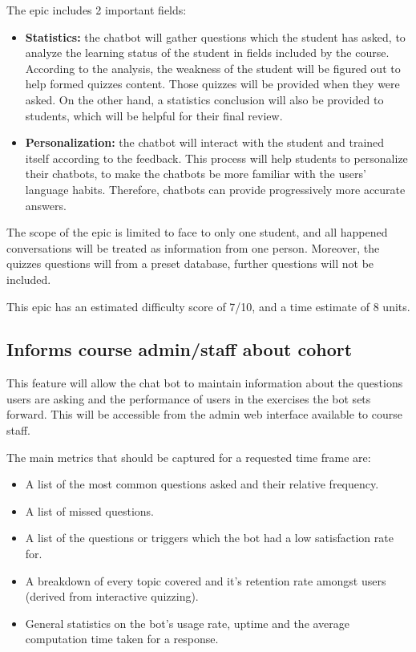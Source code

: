 \documentclass{article}
\begin{document}
The epic includes 2 important fields:
\begin{itemize}
  \item \textbf{Statistics:} the chatbot will gather questions which the student has asked, to analyze the learning status of the student in fields included by the course. According to the analysis, the weakness of the student will be figured out to help formed quizzes content. Those quizzes will be provided when they were asked. On the other hand, a statistics conclusion will also be provided to students, which will be helpful for their final review.
  \item \textbf{Personalization:} the chatbot will interact with the student and trained itself according to the feedback. This process will help students to personalize their chatbots, to make the chatbots be more familiar with the users’ language habits. Therefore, chatbots can provide progressively more accurate answers. 
\end{itemize}

The scope of the epic is limited to face to only one student, and all happened conversations will be treated as information from one person. Moreover, the quizzes questions will from a preset database, further questions will not be included.

This epic has an estimated difficulty score of 7/10, and a time estimate of 8 units.


\subsection{Informs course admin/staff about cohort}

This feature will allow the chat bot to maintain information about the questions users are asking and the performance of users in the exercises the bot sets forward. This will be accessible from the admin web interface available to course staff.

The main metrics that should be captured for a requested time frame are:
\begin{itemize}
  \item A list of the most common questions asked and their relative frequency.
  \item A list of missed questions.
  \item A list of the questions or triggers which the bot had a low satisfaction rate for.
  \item A breakdown of every topic covered and it's retention rate amongst users (derived from interactive quizzing).
  \item General statistics on the bot's usage rate, uptime and the average computation time taken for a response.
\end{itemize}
\end{document}
